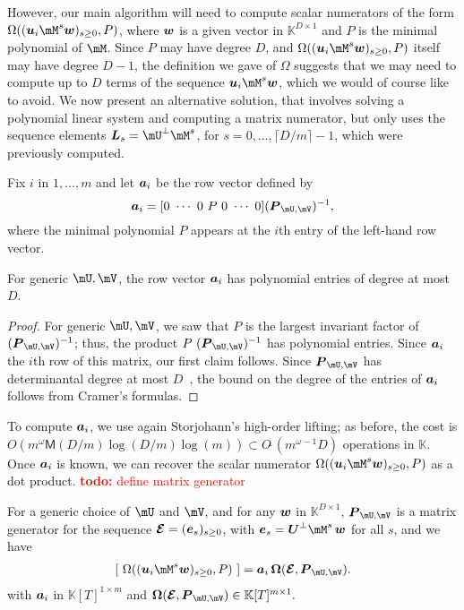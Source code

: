 \documentclass[12pt]{article}
\newcommand{\var}{T} %
\newcommand{\mat}[1]{\bm{\MakeUppercase{#1}}} %
\newcommand{\row}[1]{\bm{\MakeLowercase{#1}}} %
\newcommand{\col}[1]{\bm{\MakeLowercase{#1}}} %
\newcommand{\softO}[1]{O{\tilde{~}}(#1)} %
\newcommand{\todo}[1]{\textcolor{red}{{\bf todo:} #1}}
\newcommand{\minpoly}{P}
\def\M {\ensuremath{\mathsf{M}}}
\def\K{\mathbb{K}}
\def\K {\ensuremath{\mathbb{K}}}
\begin{document}
However, our main algorithm will need to compute scalar numerators of
the form \sloppy $\Omega((\row{u}_i \mM^s \col{w})_{s \ge 0},
\minpoly)$, where $\row{w}$ is a given vector in $\K^{D \times 1}$ and
$\minpoly$ is the minimal polynomial of $\mM$. Since $\minpoly$ may
have degree $D$, and $\Omega((\row{u}_i \mM^s \col{w})_{s \ge 0},
\minpoly)$ itself may have degree $D-1$,
the definition we gave of $\Omega$ suggests that we
may need to compute up to $D$ terms of the sequence $\row{u}_i \mM^s
\col{w}$, which we would of course like to avoid. We now present an
alternative solution, that involves solving a polynomial linear system
and computing a matrix numerator, but only uses the sequence elements
$\mat{L}_s= \mU^\perp \mM^s$, for $s=0,\dots,\lceil D/m \rceil-1$,
which were previously computed.

Fix $i$ in $1,\dots,m$ and let $\row{a}_i$ be the row vector defined
by $$\row{a}_i =[0~\cdots~0~\minpoly~0~\cdots~0]  (\mat{P}_{\mU,\mV})^{-1} ,$$
where the minimal polynomial $\minpoly$ appears at the $i$th entry  of the
left-hand row vector. 
\begin{lemma}\label{utilde}
  For generic $\mU,\mV$, the row vector $\row{a}_i$ has polynomial
  entries of degree at most~$D$.
\end{lemma}
\begin{proof}
  For generic $\mU,\mV$, we saw that $\minpoly$ is the largest
  invariant factor of $ (\mat{P}_{\mU,\mV})^{-1}$; thus, the product
  $\minpoly\ (\mat{P}_{\mU,\mV})^{-1}$ has polynomial entries. Since $\row{a}_i$ 
  the $i$th row of this matrix, our first claim follows. Since
  $\mat{P}_{\mU,\mV}$ has determinantal degree at most $D$~\cite{xxx}, the bound
  on the degree of the entries of $\row{a}_i$ follows from Cramer's
  formulas.
\end{proof}
To compute $\row{a}_i$, we use again Storjohann's high-order lifting;
as before, the cost is $O(m^{\omega} \M(D/m) \log(D/m) \log(m))
\subset \softO{m^{\omega-1}D}$ operations in $\K$.
Once $\row{a}_i$ is known, we can recover the scalar numerator
$\Omega((\row{u}_i \mM^s \col{w})_{s \ge 0}, \minpoly)$ as
a dot product. \todo{define matrix generator}
\begin{lemma}
  For a generic choice of $\mU$ and $\mV$, and for any $\col{w}$ in $\K^{D \times 1}$, $ \mat{P}_{\mU,\mV}$ is a matrix generator 
  for the sequence $\mat{\mathcal{E}} = (\col{e}_s)_{s\ge0}$, with
  $\col{e}_s=\mat{U}^\perp \mM^s\, \col{w}$ for all $s$,
  and we have 
\begin{align}\label{eq:OmegaOmega}
[~\Omega((\row{u}_i \mM^s \col{w})_{s \ge 0}, \minpoly)~] = \row{a}_i\, \mat{\Omega}(\mat{\mathcal{E}}, \mat{P}_{\mU,\mV}).
\end{align}
with $\row{a}_i$ in $\K[\var]^{1 \times m}$ and 
$\mat{\Omega}(\mat{\mathcal{E}} , \mat{P}_{\mU,\mV}) \in \K[\var]^{m \times 1}.$
\end{lemma}
\end{document}

